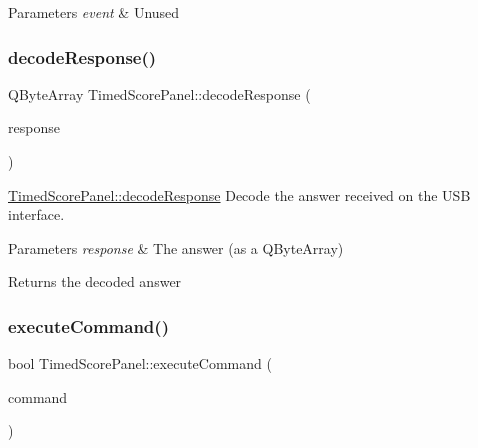 \begin{DoxyParams}{Parameters}
{\em event} & Unused \\
\hline
\end{DoxyParams}
\mbox{\label{classTimedScorePanel_aa4af54da0ec58b24e4e36812c90de9b8}} 
\subsubsection{\texorpdfstring{decode\+Response()}{decodeResponse()}}
{\footnotesize\ttfamily Q\+Byte\+Array Timed\+Score\+Panel\+::decode\+Response (\begin{DoxyParamCaption}\item[{Q\+Byte\+Array}]{response }\end{DoxyParamCaption})\hspace{0.3cm}{\ttfamily [protected]}}



\mbox{\hyperlink{classTimedScorePanel_aa4af54da0ec58b24e4e36812c90de9b8}{Timed\+Score\+Panel\+::decode\+Response}} Decode the answer received on the U\+SB interface. 


\begin{DoxyParams}{Parameters}
{\em response} & The answer (as a Q\+Byte\+Array) \\
\hline
\end{DoxyParams}
\begin{DoxyReturn}{Returns}
the decoded answer 
\end{DoxyReturn}
\mbox{\label{classTimedScorePanel_a0b1e7a7596b1e059571c65ce6046c343}} 
\subsubsection{\texorpdfstring{execute\+Command()}{executeCommand()}}
{\footnotesize\ttfamily bool Timed\+Score\+Panel\+::execute\+Command (\begin{DoxyParamCaption}\item[{Q\+Byte\+Array}]{command }\end{DoxyParamCaption})\hspace{0.3cm}{\ttfamily [protected]}}



